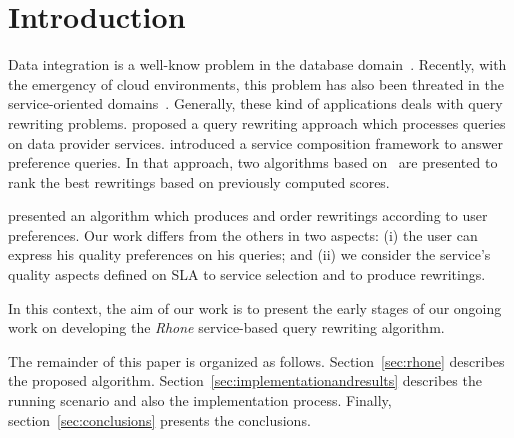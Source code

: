\section{Introduction}
Data integration is a well-know problem in the database domain~\cite{Halevy:2001}. 
Recently, with the emergency of cloud environments, this problem has also been threated in the service-oriented domains~\cite{Barhamgi2010,Benouaret2011,ba2014}.
Generally, these kind of applications deals with query rewriting problems.
\cite{Barhamgi2010} proposed a query rewriting approach which processes queries on data provider services. \cite{Benouaret2011} introduced a service composition framework to answer preference queries. In that approach, two algorithms based on~\cite{Barhamgi2010} are presented to rank the best rewritings based on previously computed scores.

\cite{ba2014} presented an algorithm which produces and order rewritings according to user preferences.
Our work differs from the others in two aspects: (i) the user can express his
quality preferences on his queries; and (ii) we consider the service's quality
aspects defined on SLA to service selection and to produce rewritings.    

In this context, the aim of our work is to present the early stages of our
ongoing work on developing the \textit{Rhone} service-based query rewriting
algorithm.

The remainder of this paper is organized as follows. Section~\ref{sec:rhone}
describes the proposed algorithm. Section~\ref{sec:implementationandresults} describes
the running scenario and also the implementation process.
Finally, section~\ref{sec:conclusions} presents the conclusions.
